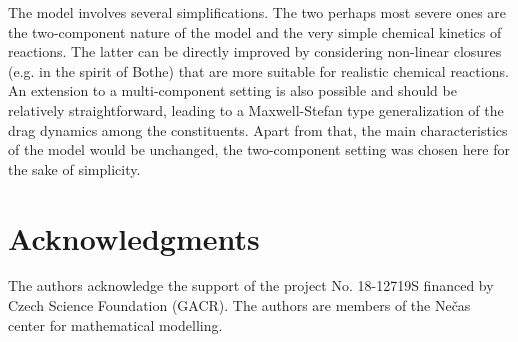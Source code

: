 \documentclass[a4paper]{article}
\begin{document}
The model involves several simplifications. The two perhaps most severe ones are the two-component nature of the model and the very simple chemical kinetics of reactions. The latter can be directly improved by considering non-linear closures (e.g. in the spirit of  Bothe\cite{bothe-2015}) that are more suitable for realistic chemical reactions. An extension to a multi-component setting is also possible and should be relatively straightforward, leading to a Maxwell-Stefan type generalization of the drag dynamics among the constituents. Apart from that, the main characteristics of the model would be unchanged, the two-component setting was chosen here for the sake of simplicity.

\section{Acknowledgments} The authors acknowledge the support of the project No. 18-12719S
financed by Czech Science Foundation (GACR). The authors are members of the Ne\v{c}as
center for mathematical modelling. 

%

%
%
\end{document}
